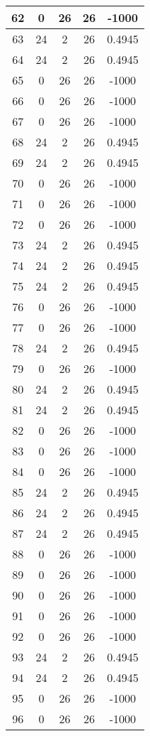 \documentclass[letterpaper, 12pt]{article}
\begin{document}
\begin{longtable}{|c|c|c|c|c|}
\hline
62 & 0 & 26 & 26 & -1000 \\
\hline
63 & 24 & 2 & 26 & 0.4945 \\
\hline
64 & 24 & 2 & 26 & 0.4945 \\
\hline
65 & 0 & 26 & 26 & -1000 \\
\hline
66 & 0 & 26 & 26 & -1000 \\
\hline
67 & 0 & 26 & 26 & -1000 \\
\hline
68 & 24 & 2 & 26 & 0.4945 \\
\hline
69 & 24 & 2 & 26 & 0.4945 \\
\hline
70 & 0 & 26 & 26 & -1000 \\
\hline
71 & 0 & 26 & 26 & -1000 \\
\hline
72 & 0 & 26 & 26 & -1000 \\
\hline
73 & 24 & 2 & 26 & 0.4945 \\
\hline
74 & 24 & 2 & 26 & 0.4945 \\
\hline
75 & 24 & 2 & 26 & 0.4945 \\
\hline
76 & 0 & 26 & 26 & -1000 \\
\hline
77 & 0 & 26 & 26 & -1000 \\
\hline
78 & 24 & 2 & 26 & 0.4945 \\
\hline
79 & 0 & 26 & 26 & -1000 \\
\hline
80 & 24 & 2 & 26 & 0.4945 \\
\hline
81 & 24 & 2 & 26 & 0.4945 \\
\hline
82 & 0 & 26 & 26 & -1000 \\
\hline
83 & 0 & 26 & 26 & -1000 \\
\hline
84 & 0 & 26 & 26 & -1000 \\
\hline
85 & 24 & 2 & 26 & 0.4945 \\
\hline
86 & 24 & 2 & 26 & 0.4945 \\
\hline
87 & 24 & 2 & 26 & 0.4945 \\
\hline
88 & 0 & 26 & 26 & -1000 \\
\hline
89 & 0 & 26 & 26 & -1000 \\
\hline
90 & 0 & 26 & 26 & -1000 \\
\hline
91 & 0 & 26 & 26 & -1000 \\
\hline
92 & 0 & 26 & 26 & -1000 \\
\hline
93 & 24 & 2 & 26 & 0.4945 \\
\hline
94 & 24 & 2 & 26 & 0.4945 \\
\hline
95 & 0 & 26 & 26 & -1000 \\
\hline
96 & 0 & 26 & 26 & -1000 \\

\end{longtable}
\end{document}

